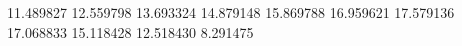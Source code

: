 11.489827
12.559798
13.693324
14.879148
15.869788
16.959621
17.579136
17.068833
15.118428
12.518430
8.291475
